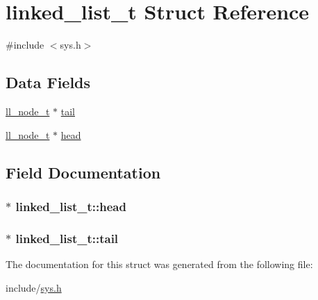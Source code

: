 \hypertarget{structlinked__list__t}{}\section{linked\+\_\+list\+\_\+t Struct Reference}
\label{structlinked__list__t}


{\ttfamily \#include $<$sys.\+h$>$}

\subsection*{Data Fields}
\begin{DoxyCompactItemize}
\item 
\hyperlink{structll__node__t}{ll\+\_\+node\+\_\+t} $\ast$ \hyperlink{structlinked__list__t_af5d010a866e6f1490a87934d19d09678}{tail}
\item 
\hyperlink{structll__node__t}{ll\+\_\+node\+\_\+t} $\ast$ \hyperlink{structlinked__list__t_a64ea186cf01cd4d97256e207d5c495a2}{head}
\end{DoxyCompactItemize}


\subsection{Field Documentation}
\subsubsection[{\texorpdfstring{head}{head}}]{$\ast$ linked\+\_\+list\+\_\+t\+::head}\hypertarget{structlinked__list__t_a64ea186cf01cd4d97256e207d5c495a2}{}\label{structlinked__list__t_a64ea186cf01cd4d97256e207d5c495a2}
\subsubsection[{\texorpdfstring{tail}{tail}}]{$\ast$ linked\+\_\+list\+\_\+t\+::tail}\hypertarget{structlinked__list__t_af5d010a866e6f1490a87934d19d09678}{}\label{structlinked__list__t_af5d010a866e6f1490a87934d19d09678}


The documentation for this struct was generated from the following file\+:\begin{DoxyCompactItemize}
\item 
include/\hyperlink{sys_8h}{sys.\+h}\end{DoxyCompactItemize}
